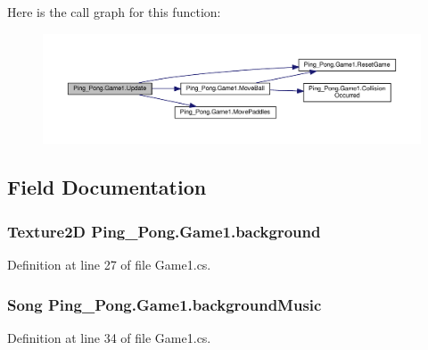 Here is the call graph for this function\-:\nopagebreak
\begin{figure}[H]
\begin{center}
\leavevmode
\includegraphics[width=350pt]{class_ping___pong_1_1_game1_adcf5d3a66fa192e3318b14188dd0c34a_cgraph}
\end{center}
\end{figure}




\subsection{Field Documentation}
\hypertarget{class_ping___pong_1_1_game1_ae0f525562a3eb615b556f4a9a1eda3e7}{
\subsubsection[{background}]{\setlength{\rightskip}{0pt plus 5cm}Texture2\-D Ping\-\_\-\-Pong.\-Game1.\-background\hspace{0.3cm}{\ttfamily [private]}}}\label{class_ping___pong_1_1_game1_ae0f525562a3eb615b556f4a9a1eda3e7}


Definition at line 27 of file Game1.\-cs.

\hypertarget{class_ping___pong_1_1_game1_ab6439b5c8bcfb4ba77f2a62ab4c73213}{
\subsubsection[{background\-Music}]{\setlength{\rightskip}{0pt plus 5cm}Song Ping\-\_\-\-Pong.\-Game1.\-background\-Music\hspace{0.3cm}{\ttfamily [private]}}}\label{class_ping___pong_1_1_game1_ab6439b5c8bcfb4ba77f2a62ab4c73213}


Definition at line 34 of file Game1.\-cs.

